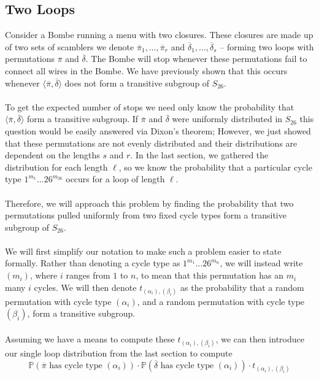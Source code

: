 \subsection{Two Loops}
Consider a Bombe running a menu with two closures. These closures are made up of two sets of scamblers we denote $\overline\pi_1, \dots, \overline\pi_r$ and $\overline\delta_1,\dots,\overline\delta_s$ -- forming two loops with permutations $\overline\pi$ and $\overline\delta$. The Bombe will stop whenever these permutations fail to connect all wires in the Bombe. We have previously shown that this occurs whenever $\langle \overline\pi, \overline\delta \rangle$ does not form a transitive subgroup of $S_{26}$.
\\\\To get the expected number of stops we need only know the probability that $\langle \overline\pi, \overline\delta \rangle$ form a transitive subgroup. If $\overline\pi$ and $\overline\delta$ were uniformly distributed in $S_{26}$ this question would be easily answered via Dixon's theorem; However, we just showed that these permutations are not evenly distributed and their distributions are dependent on the lengths $s$ and $r$. In the last section, we gathered the distribution for each length $\ell$, so we know the probability that a particular cycle type $1^{m_1}\dots26^{m_{26}}$ occurs for a loop of length $\ell$.
\\\\Therefore, we will approach this problem by finding the probability that two permutations pulled uniformly from two fixed cycle types form a transitive subgroup of $S_{26}$.
\\\\We will first simplify our notation to make such a problem easier to state formally. Rather than denoting a cycle type as $1^{m_1}\dots26^{m_{n}}$, we will instead write $(m_i)$, where $i$ ranges from $1$ to $n$, to mean that this permutation has an $m_i$ many $i$ cycles. We will then denote $t_{(\alpha_i), (\beta_i)}$ as the probability that a random permutation with cycle type $(\alpha_i)$, and a random permutation with cycle type $(\beta_i)$, form a transitive subgroup.
\\\\Assuming we have a means to compute these $t_{(\alpha_i), (\beta_i)}$, we can then introduce our single loop distribution from the last section to compute
\[
	\mathbb{P}(\overline\pi\text{ has cycle type }(\alpha_i))\cdot\mathbb{P}(\overline\delta\text{ has cycle type }(\alpha_i))\cdot t_{(\alpha_i), (\beta_i)}
\]
